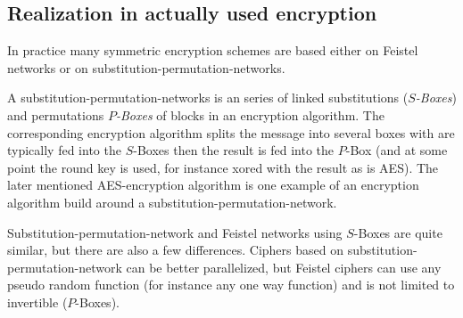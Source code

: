 \subsection{Realization in actually used encryption}
 In practice many symmetric encryption schemes are based either on Feistel networks or on substitution-permutation-networks. 
 \begin{definition}
  A substitution-permutation-networks is an series of linked substitutions (\emph{$S$-Boxes}) and permutations \emph{$P$-Boxes} of blocks in an encryption algorithm. The corresponding encryption algorithm splits the message into several boxes with are typically fed into the $S$-Boxes then the result is fed into the $P$-Box (and at some point the round key is used, for instance xored with the result as is AES). The later mentioned AES-encryption algorithm is one example of an encryption algorithm build around a substitution-permutation-network.
 \end{definition}
 Substitution-permutation-network and Feistel networks using $S$-Boxes are quite similar, but there are also a few differences. Ciphers based on substitution-permutation-network can be better parallelized, but Feistel ciphers can use any pseudo random function (for instance any one way function) and is not limited to invertible ($P$-Boxes). 
